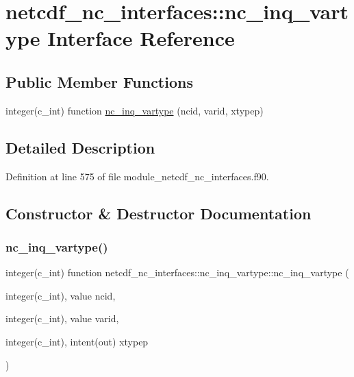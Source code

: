 \hypertarget{interfacenetcdf__nc__interfaces_1_1nc__inq__vartype}{}\section{netcdf\+\_\+nc\+\_\+interfaces\+:\+:nc\+\_\+inq\+\_\+vartype Interface Reference}
\label{interfacenetcdf__nc__interfaces_1_1nc__inq__vartype}
\subsection*{Public Member Functions}
\begin{DoxyCompactItemize}
\item 
integer(c\+\_\+int) function \hyperlink{interfacenetcdf__nc__interfaces_1_1nc__inq__vartype_a796bae68b2eb33b4389ec2331730b53b}{nc\+\_\+inq\+\_\+vartype} (ncid, varid, xtypep)
\end{DoxyCompactItemize}


\subsection{Detailed Description}


Definition at line 575 of file module\+\_\+netcdf\+\_\+nc\+\_\+interfaces.\+f90.



\subsection{Constructor \& Destructor Documentation}
\mbox{\label{interfacenetcdf__nc__interfaces_1_1nc__inq__vartype_a796bae68b2eb33b4389ec2331730b53b}} 
\subsubsection{\texorpdfstring{nc\+\_\+inq\+\_\+vartype()}{nc\_inq\_vartype()}}
{\footnotesize\ttfamily integer(c\+\_\+int) function netcdf\+\_\+nc\+\_\+interfaces\+::nc\+\_\+inq\+\_\+vartype\+::nc\+\_\+inq\+\_\+vartype (\begin{DoxyParamCaption}\item[{integer(c\+\_\+int), value}]{ncid,  }\item[{integer(c\+\_\+int), value}]{varid,  }\item[{integer(c\+\_\+int), intent(out)}]{xtypep }\end{DoxyParamCaption})}



